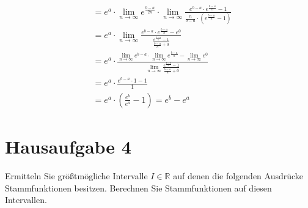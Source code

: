 \documentclass{article}
\begin{document}
\begin{align*}
                    &=  e^a \cdot  \lim_{n \to \infty} e^{\frac{b-a}{2n}} \cdot \lim_{n \to \infty} \frac{e^{b - a} \cdot e^{\frac{b-a}{n}} - 1}{\frac{n}{b - a} \cdot \left(e^{\frac{b-a}{n}} - 1\right)} \\
                    &=  e^a \cdot \lim_{n \to \infty} \frac{e^{b - a} \cdot e^{\frac{b-a}{n}} - e^0}{\frac{e^{\frac{b-a}{n}} - 1}{\frac{b - a}{n} + 0}} \\
                    &=  e^a \cdot  \frac{\lim_{n \to \infty} e^{b - a} \cdot \lim_{n \to \infty} e^{\frac{b-a}{n}} - \lim_{n \to \infty} e^0}{\lim_{n \to \infty} \frac{e^{\frac{b-a}{n}} - 1}{\frac{b - a}{n} + 0}} \\
                    &= e^a \cdot \frac{e^{b - a} \cdot 1 - 1}{1} \\
                    &= e^a \cdot \left( \frac{e^b}{e^a} - 1\right) = e^b - e^a
\end{align*}

\section*{Hausaufgabe 4}

Ermitteln Sie größtmögliche Intervalle $I \in \mathbb{R}$ auf denen
die folgenden Ausdrücke Stammfunktionen besitzen.
Berechnen Sie Stammfunktionen auf diesen Intervallen.
\end{document}

